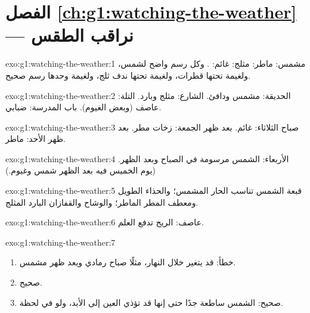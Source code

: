 \section*{الفصل \ref{ch:g1:watching-the-weather} --- نراقب الطقس}

\begin{solution}{exo:g1:watching-the-weather:1}
مشمس: \quad ماطر: \quad مثلج: \quad
غائم: . وكل رسم واضح لشمس، ولغيمة تحتها قطرات، ولغيمة
تحتها ندف ثلج، ولغيمة وحدها رسم صحيح.
\end{solution}

\begin{solution}{exo:g1:watching-the-weather:2}
الحديقة: مشمس ودافئ. الشارع: مثلج وبارد. التلة: عاصف (وبعض
الغيوم). باب المدرسة: ضبابي.
\end{solution}

\begin{solution}{exo:g1:watching-the-weather:3}
صباح الثلاثاء: غائم. بعد ظهر الجمعة: زخات مطر. بعد ظهر الأحد:
ماطر.
\end{solution}

\begin{solution}{exo:g1:watching-the-weather:4}
الأربعاء: الشمس مرسومة في الصباح وبعد الظهر.
(يوم الخميس فيه بعد الظهر شمس وغيوم.)
\end{solution}

\begin{solution}{exo:g1:watching-the-weather:5}
قبعة الشمس تناسب  الحار المشمس؛ والحذاء الطويل ومعطف المطر
 الماطر؛ والوشاح والقفازان  البارد المثلج.
\end{solution}

\begin{solution}{exo:g1:watching-the-weather:6}
 عاصف: الريح تدفع العلم.
\end{solution}

\begin{solution}{exo:g1:watching-the-weather:7}
\begin{enumerate}
  \item خطأ: قد يتغير  خلال النهار، مثلًا صباح رمادي وبعد
        ظهر مشمس.
  \item صحيح.
  \item صحيح: الشمس ساطعة جدًا حتى إنها قد تؤذي العين إلى الأبد،
        ولو في لحظة.
\end{enumerate}
\end{solution}

